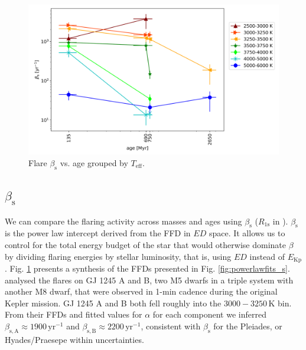 \documentclass{aa}
\begin{document}
\begin{figure}
    \centering
    \includegraphics[width=13.5cm]{pics/FFDs/beta_T_age_ED_wheatland.png}
    \caption{Flare $\beta_\mathrm{s}$ vs. age grouped by $T_\mathrm{eff}$.}          	
    \label{fig:beta_T_age}
\end{figure}
\subsection{$\beta_\mathrm{s}$}
We can compare the flaring activity across masses and ages using $\beta_\mathrm{s}$ ($R_\mathrm{1s}$ in \citealt{davenport2019}). $\beta_\mathrm{s}$ is the power law intercept derived from the FFD in $ED$ space. It allows us to control for the total energy budget of the star that would otherwise dominate $\beta$ by dividing flaring energies by stellar luminosity, that is, using $ED$ instead of $E_\mathrm{Kp}$. Fig. \ref{fig:beta_T_age} presents a synthesis of the FFDs presented in Fig. \ref{fig:powerlawfits_s}. 
\\
\citet{lurie2015} analysed the flares on GJ 1245 A and B, two M5 dwarfs in a triple system with another M8 dwarf, that were observed in 1-min cadence during the original Kepler mission. GJ 1245 A and B both fell roughly into the $3000-3250\,$K bin. From their FFDs and fitted values for $\alpha$ for each component we inferred $\beta_\mathrm{s,A}\approx 1900\,\mathrm{yr}^{-1}$  and $\beta_\mathrm{s,B}\approx 2200\,\mathrm{yr}^{-1}$, consistent with $\beta_\mathrm{s}$ for the Pleiades, or Hyades/Praesepe within uncertainties.
\end{document}
